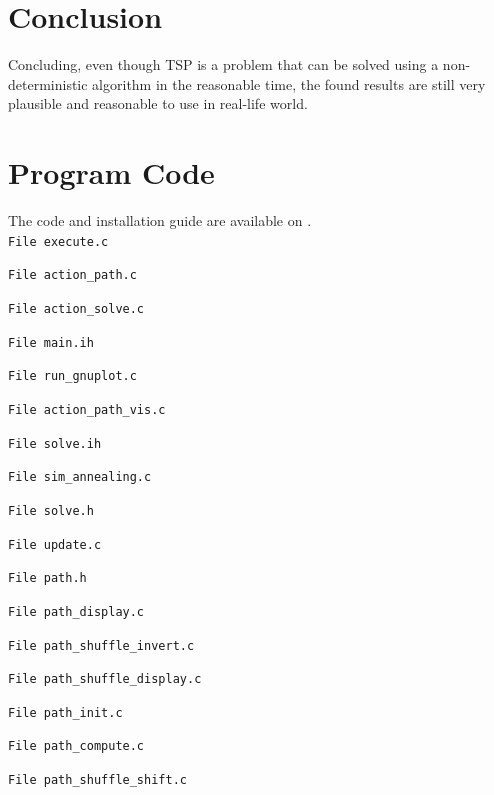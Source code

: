 \documentclass{article}
\begin{document}
\section{Conclusion}

Concluding, even though TSP is a problem that can be solved using a non-deterministic algorithm in the reasonable time, the found results are still very plausible and reasonable to use in real-life world. 

\appendix
\section{Program Code}

The code and installation guide are available on \cite{github}.
\\
\texttt{File execute.c}


\texttt{File action\_path.c}


\texttt{File action\_solve.c}


\texttt{File main.ih}


\texttt{File run\_gnuplot.c}


\texttt{File action\_path\_vis.c}


\texttt{File solve.ih}


\texttt{File sim\_annealing.c}


\texttt{File solve.h}


\texttt{File update.c}


\texttt{File path.h}


\texttt{File path\_display.c}


\texttt{File path\_shuffle\_invert.c}


\texttt{File path\_shuffle\_display.c}


\texttt{File path\_init.c}


\texttt{File path\_compute.c}


\texttt{File path\_shuffle\_shift.c}

\end{document}
